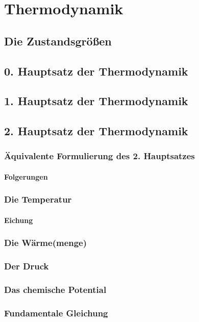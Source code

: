 \section{Thermodynamik}
\subsection{Die Zustandsgrößen}
\subsection{0. Hauptsatz der Thermodynamik}
\subsection{1. Hauptsatz der Thermodynamik}
\subsection{2. Hauptsatz der Thermodynamik}
\subsubsection{Äquivalente Formulierung des 2. Hauptsatzes}
\paragraph{Folgerungen}
\subsubsection{Die Temperatur}
\paragraph{Eichung}
\subsubsection{Die Wärme(menge)}
\subsubsection{Der Druck}
\subsubsection{Das chemische Potential}
\subsubsection{Fundamentale Gleichung}
